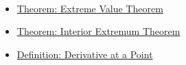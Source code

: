 \begin{remark*}[Dependencies]~\\
\begin{itemize}
  \item \hyperref[thm:extreme-value-theorem]{Theorem: Extreme Value Theorem}
  \item \hyperref[thm:interior-extremum-theorem]{Theorem: Interior Extremum Theorem}
  \item \hyperref[def:derivative-at-a-point]{Definition: Derivative at a Point}
\end{itemize}
\end{remark*}

\clearpage
